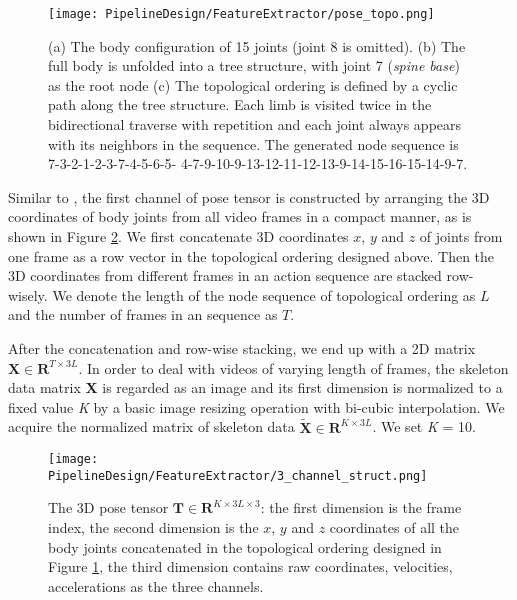 \begin{figure}[h!]
  \centering
  \texttt{[image: PipelineDesign/FeatureExtractor/pose\_topo.png]}
  \caption{(a) The body configuration of 15 joints (joint 8 is omitted). (b) The full body is unfolded
           into a tree structure, with joint 7 (\textit{spine base}) as the root node (c) The
           topological ordering is defined by a cyclic path along the tree structure. Each limb is
           visited twice in the bidirectional traverse with repetition and each joint always appears
           with its neighbors in the sequence. The generated node sequence is 7-3-2-1-2-3-7-4-5-6-5-
           4-7-9-10-9-13-12-11-12-13-9-14-15-16-15-14-9-7. \cite{lin2018}}
  \label{fig:pose_topo}
\end{figure} 

Similar to \cite{DBLP:journals/corr/Baradel0M17}, the first channel of pose tensor is constructed by arranging the 3D coordinates of body joints from all video frames in a compact manner, as is shown in
Figure \ref{fig:3_channel_struct}. We first concatenate 3D coordinates $x$, $y$ and $z$ of joints from one frame as a row vector in the topological ordering designed above. Then the 3D coordinates from different frames in an action sequence are stacked row-wisely. We denote the length of the node sequence of topological ordering as $L$ and the number of frames in an sequence as $T$.

After the concatenation and row-wise stacking, we end up with a 2D matrix $\mathbf{X} \in \mathbf{R}^{T \times 3L}$. In order to deal with videos of varying length of frames, the skeleton data matrix \textbf{X} is regarded as an image and its first dimension is normalized to a fixed value \textit{K} by a basic image resizing operation with bi-cubic interpolation. We acquire the normalized matrix of
skeleton data $\tilde{\mathbf{X}} \in \mathbf{R}^{K \times 3L}$. We set \textit{K} = 10.

\begin{figure}[h!]
  \centering
  \texttt{[image: PipelineDesign/FeatureExtractor/3\_channel\_struct.png]}
  \caption{The 3D pose tensor $\mathbf{T} \in \mathbf{R}^{K \times 3L \times 3}$: the first dimension
           is the frame index, the second dimension is the $x$, $y$ and $z$ coordinates of all the body 
           joints concatenated in the topological ordering designed in Figure \ref{fig:pose_topo}, 
           the third dimension contains raw coordinates, velocities, accelerations as the three 
           channels. \cite{lin2018}}
  \label{fig:3_channel_struct}
\end{figure} 

